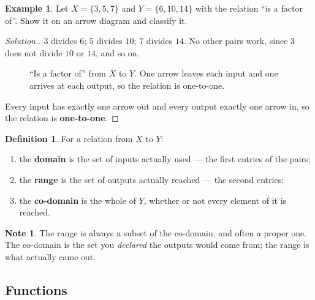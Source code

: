\documentclass[11pt,a4paper]{article}
\theoremstyle{definition}
\newtheorem{definition}[thm]{Definition}
\newtheorem{example}[thm]{Example}
\newtheorem{note}[thm]{Note}
\newenvironment{solution}
  {\renewcommand{\qedsymbol}{}\begin{proof}[\textit{Solution}.]}
  {\end{proof}}
\begin{document}
\begin{example}
Let $X=\{3,5,7\}$ and $Y=\{6,10,14\}$ with the relation ``is a factor of''. Show it on
an arrow diagram and classify it.
\end{example}

\begin{solution}
$3$ divides $6$; $5$ divides $10$; $7$ divides $14$. No other pairs work, since $3$
does not divide $10$ or $14$, and so on.
\begin{figure}[H]
\centering
{}
\caption{``Is a factor of'' from $X$ to $Y$. One arrow leaves each input and one arrives at each output, so the relation is one-to-one.}
\end{figure}
Every input has exactly one arrow out and every output exactly one arrow in, so the
relation is \textbf{one-to-one}.
\end{solution}

\begin{definition}
For a relation from $X$ to $Y$:
\begin{enumerate}
\item[(i).] the \textbf{domain} is the set of inputs actually used --- the first
entries of the pairs;
\item[(ii).] the \textbf{range} is the set of outputs actually reached --- the second
entries;
\item[(iii).] the \textbf{co-domain} is the whole of $Y$, whether or not every element
of it is reached.
\end{enumerate}
\end{definition}

\begin{note}
The range is always a subset of the co-domain, and often a proper one. The co-domain is
the set you \emph{declared} the outputs would come from; the range is what actually
came out.
\end{note}

\subsection{Functions}
\end{document}
